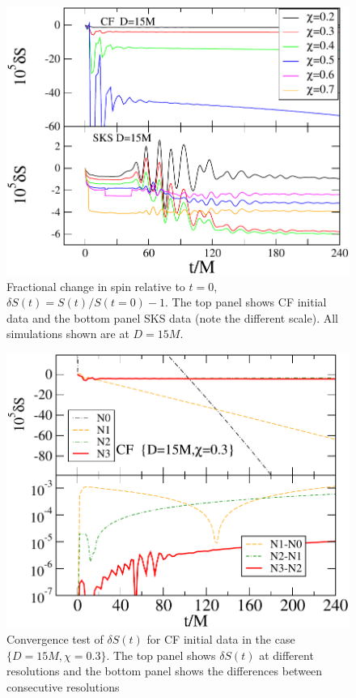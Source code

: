 \begin{figure}
\includegraphics[width=0.95\columnwidth]{chap5/SvsT2}
\caption[$\delta S(t)$ for CF and SKS initial data.]{Fractional change
  in spin relative to $t=0$, $\delta S(t) = S(t)/S(t=0)-1$.  The top
  panel shows CF initial data and the bottom panel SKS data (note the
  different scale).  All simulations shown are at $D=15M$.}
\label{fig:SvsT2}
\end{figure}


\begin{figure}
  \includegraphics[width=0.95\columnwidth]{chap5/CFSConvergence1}
  \caption[Convergence test of $\delta S(t)$ for CF initial data.]{Convergence test of $\delta S(t)$ for CF initial data in the case
    $\{D=15M,\chi=0.3\}$. The top panel shows $\delta S(t)$ at different
    resolutions and the bottom panel shows the differences between
    consecutive resolutions}
  \label{fig:CFSConvergence1}
\end{figure}

